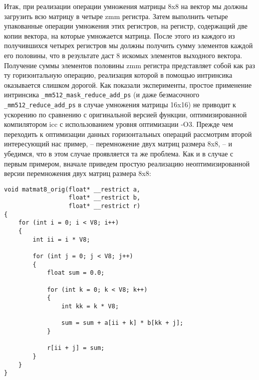 Итак, при реализации операции умножения матрицы 8x8 на вектор мы должны загрузить всю матрицу в четыре zmm регистра.
Затем выполнить четыре упакованные операции умножения этих регистров, на регистр, содержащий две копии вектора, на которые умножается матрица.
После этого из каждого из получившихся четырех регистров мы должны получить сумму элементов каждой его половины, что в результате даст 8 искомых элементов выходного вектора.
Получение суммы элементов половины zmm регистра представляет собой как раз ту горизонтальную операцию, реализация которой в помощью интринсика оказывается слишком дорогой.
Как показали эксперименты, простое применение интринсика \texttt{\_mm512\_mask\_reduce\_add\_ps} (и даже безмасочного \texttt{\_mm512\_reduce\_add\_ps} в случае умножения матрицы 16x16) не приводит к ускорению по сравнению с оригинальной версией функции, оптимизированной компилятором icc с использованием уровня оптимизации -O3.
Прежде чем переходить к оптимизации данных горизонтальных операций рассмотрим второй интересующий нас пример, -- перемножение двух матриц размера 8x8, -- и убедимся, что в этом случае проявляется та же проблема.
Как и в случае с первым примером, вначале приведем простую реализацию неоптимизированной версии перемножения двух матриц размера 8x8:

\begin{lstlisting}[caption={Невекторизованная версия перемножения матриц размера $8 \times 8$}, label={lst:text_4_small_matr_8x8_mul_matr_noopt}]
void matmat8_orig(float* __restrict a,
                  float* __restrict b,
                  float* __restrict r)
{
    for (int i = 0; i < V8; i++)
    {
        int ii = i * V8;
 
        for (int j = 0; j < V8; j++)
        {
            float sum = 0.0;

            for (int k = 0; k < V8; k++)
            {
                int kk = k * V8;
                
                sum = sum + a[ii + k] * b[kk + j];
            }

            r[ii + j] = sum;
        }
    }
}
\end{lstlisting}
